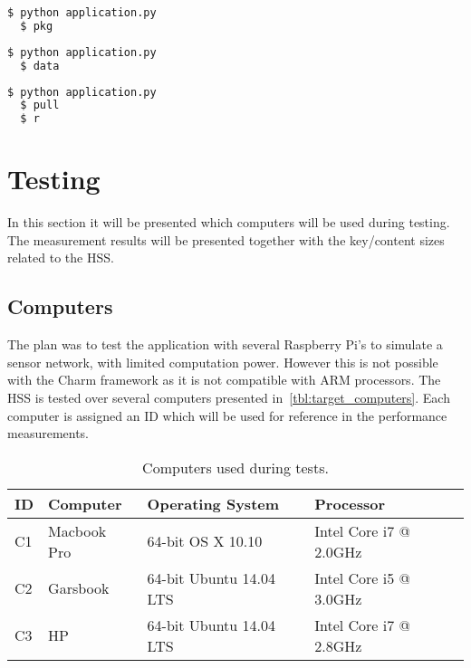 \begin{lstlisting}[language=bash, caption={Start PKG}, label={lst:pkg}]
  $ python application.py
  $ pkg
\end{lstlisting}

\begin{lstlisting}[language=bash, caption={Start a device registering a prefix.}, label={lst:data}]
  $ python application.py
  $ data
\end{lstlisting}

\begin{lstlisting}[language=bash, caption={Start a device that will express \gls{interest} in \gls{data}.}, label={lst:pull}]
  $ python application.py
  $ pull
  $ r
\end{lstlisting}

\section{Testing}
In this section it will be presented which computers will be used during testing. 
The measurement results will be presented together with the key/content sizes related to the \gls{HSS}.

\subsection{Computers}
The plan was to test the application with several Raspberry Pi's to simulate a sensor network, with limited computation power.
However this is not possible with the Charm framework as it is not compatible with ARM processors.
The \gls{HSS} is tested over several computers presented in~\autoref{tbl:target_computers}.
Each computer is assigned an ID which will be used for reference in the performance measurements.

\begin{table}[h]
  \begin{tabular}{llll}
  ID      & Computer                  & Operating System          & Processor                    \\ \hline
  C1      & Macbook Pro               & 64-bit OS X 10.10         & Intel Core i7 @ 2.0GHz       \\ %
  C2      & Garsbook                  & 64-bit Ubuntu 14.04 LTS   & Intel Core i5 @ 3.0GHz       \\ %
  C3      & HP                        & 64-bit Ubuntu 14.04 LTS   & Intel Core i7 @ 2.8GHz       \\ %
  \end{tabular}
  \caption[Test computers]{Computers used during tests.}
  \label{tbl:target_computers}
\end{table}

